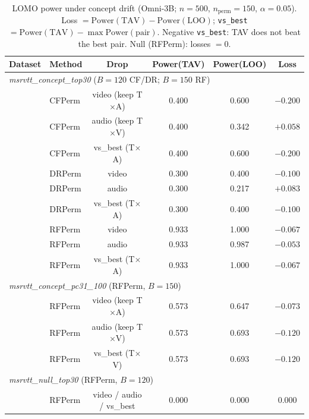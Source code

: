 \begin{table}[t]
\centering
\scriptsize
\setlength{\tabcolsep}{3.2pt}
\renewcommand{\arraystretch}{1.05}
\caption{LOMO power under concept drift (Omni-3B;
$n{=}500$, $n_{\mathrm{perm}}{=}150$, $\alpha{=}0.05$).
Loss $=\mathrm{Power}(\mathrm{TAV})-\mathrm{Power}(\mathrm{LOO})$;
\texttt{vs\_best}$=\mathrm{Power}(\mathrm{TAV})-\max\mathrm{Power}(\mathrm{pair})$.
Negative \texttt{vs\_best}: TAV does not beat the best pair.
Null (RFPerm): losses $=0$.}
\label{tab:lomo-power-cv}
\begin{tabular}{llcccc}
\toprule
Dataset & Method & Drop & Power(TAV) & Power(LOO) & Loss \\
\midrule
\multicolumn{6}{l}{\emph{msrvtt\_concept\_top30} ($B{=}120$ CF/DR; $B{=}150$ RF)} \\
 & CFPerm & video (keep T$\times$A) & 0.400 & 0.600 & $-0.200$ \\
 & CFPerm & audio (keep T$\times$V) & 0.400 & 0.342 & $+0.058$ \\
 & CFPerm & vs\_best (T$\times$A) & 0.400 & 0.600 & $-0.200$ \\
 & DRPerm & video & 0.300 & 0.400 & $-0.100$ \\
 & DRPerm & audio & 0.300 & 0.217 & $+0.083$ \\
 & DRPerm & vs\_best (T$\times$A) & 0.300 & 0.400 & $-0.100$ \\
 & RFPerm & video & 0.933 & 1.000 & $-0.067$ \\
 & RFPerm & audio & 0.933 & 0.987 & $-0.053$ \\
 & RFPerm & vs\_best (T$\times$A) & 0.933 & 1.000 & $-0.067$ \\
\midrule
\multicolumn{6}{l}{\emph{msrvtt\_concept\_pc31\_100} (RFPerm, $B{=}150$)} \\
 & RFPerm & video (keep T$\times$A) & 0.573 & 0.647 & $-0.073$ \\
 & RFPerm & audio (keep T$\times$V) & 0.573 & 0.693 & $-0.120$ \\
 & RFPerm & vs\_best (T$\times$V) & 0.573 & 0.693 & $-0.120$ \\
\midrule
\multicolumn{6}{l}{\emph{msrvtt\_null\_top30} (RFPerm, $B{=}120$)} \\
 & RFPerm & video / audio / vs\_best & 0.000 & 0.000 & $0.000$ \\
\bottomrule
\end{tabular}
\end{table}

